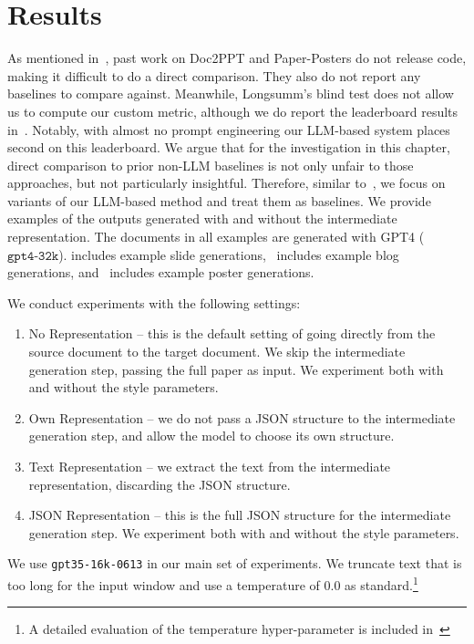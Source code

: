 
\section{Results}
As mentioned in~, past work on Doc2PPT and Paper-Posters do not release code, making it difficult to do a direct comparison. They also do not report any baselines to compare against. Meanwhile, Longsumm's blind test does not allow us to compute our custom metric, although we do report the leaderboard results in~. Notably, with almost no prompt engineering our LLM-based system places second on this leaderboard. We argue that for the investigation in this chapter, direct comparison to prior non-LLM baselines is not only unfair to those approaches, but not particularly insightful.
Therefore, similar to~\textcite{Wei2022ChainOT}, we focus on variants of our LLM-based method and treat them as baselines. We provide examples of the outputs generated with and without the intermediate representation. The documents in all examples are generated with GPT4 ($\texttt{gpt4-32k}$).  includes example slide generations,~ includes example blog generations, and~ includes example poster generations. 


We conduct experiments with the following settings:
\begin{enumerate}[label={(\arabic*)}]
    \item No Representation -- this is the default setting of going directly from the source document to the target document. We skip the intermediate generation step, passing the full paper as input. We experiment both with and without the style parameters. 
    \item Own Representation -- we do not pass a JSON structure to the intermediate generation step, and allow the model to choose its own structure.
    \item Text Representation -- we extract the text from the intermediate representation, discarding the JSON structure.
    \item JSON Representation -- this is the full JSON structure for the intermediate generation step. We experiment both with and without the style parameters.
\end{enumerate}

We use \texttt{gpt35-16k-0613} in our main set of experiments. We truncate text that is too long for the input window and use a temperature of 0.0 as standard.\footnote{A detailed evaluation of the temperature hyper-parameter is included in~}

